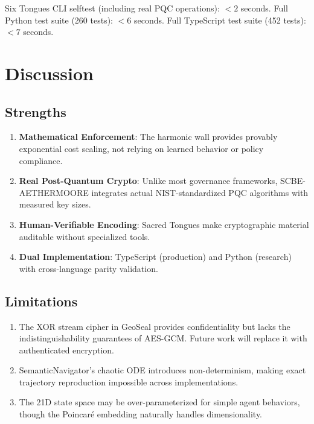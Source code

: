 \documentclass[11pt,a4paper]{article}
\begin{document}
Six Tongues CLI selftest (including real PQC operations): $<2$ seconds.
Full Python test suite (260 tests): $<6$ seconds.
Full TypeScript test suite (452 tests): $<7$ seconds.

\section{Discussion}
\label{sec:discussion}

\subsection{Strengths}

\begin{enumerate}
  \item \textbf{Mathematical Enforcement}: The harmonic wall provides
        provably exponential cost scaling, not relying on learned
        behavior or policy compliance.
  \item \textbf{Real Post-Quantum Crypto}: Unlike most governance
        frameworks, SCBE-AETHERMOORE integrates actual NIST-standardized
        PQC algorithms with measured key sizes.
  \item \textbf{Human-Verifiable Encoding}: Sacred Tongues make
        cryptographic material auditable without specialized tools.
  \item \textbf{Dual Implementation}: TypeScript (production) and
        Python (research) with cross-language parity validation.
\end{enumerate}

\subsection{Limitations}

\begin{enumerate}
  \item The XOR stream cipher in GeoSeal provides confidentiality
        but lacks the indistinguishability guarantees of AES-GCM.
        Future work will replace it with authenticated encryption.
  \item SemanticNavigator's chaotic ODE introduces non-determinism,
        making exact trajectory reproduction impossible across
        implementations.
  \item The 21D state space may be over-parameterized for simple
        agent behaviors, though the Poincar\'{e} embedding naturally
        handles dimensionality.
\end{enumerate}
\end{document}
